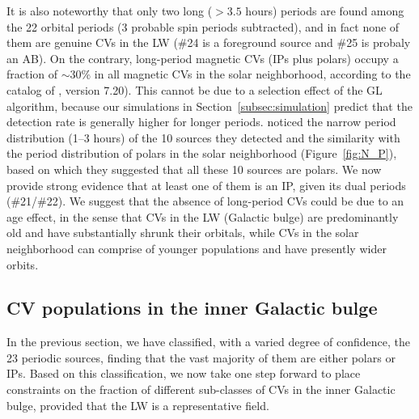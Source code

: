 \documentclass[fleqn,usenatbib]{mnras}
\begin{document}
It is also noteworthy that only two long ($>3.5$ hours) periods are found among the 22 orbital periods (3 probable spin periods subtracted), and in fact none of them are genuine CVs in the LW (\#24 is a foreground source and \#25 is probaly an AB).
On the contrary, long-period magnetic CVs (IPs plus polars) occupy a fraction of $\sim$30\% in all magnetic CVs in the solar neighborhood, according to the catalog of \citealp{2003A&A...404..301R}, version 7.20). 
This cannot be due to a selection effect of the GL algorithm, because our simulations in Section~\ref{subsec:simulation} predict that the detection rate is generally higher for longer periods.
\cite{2012ApJ...746..165H} noticed the narrow period distribution (1--3 hours) of the 10 sources they detected and the similarity with the period distribution of polars in the solar neighborhood (Figure~\ref{fig:N_P}), based on which they suggested that all these 10 sources are polars. 
We now provide strong evidence that at least one of them is an IP, given its dual periods (\#21/\#22).
We suggest that the absence of long-period CVs could be due to an age effect, in the sense that CVs in the LW (Galactic bulge) are predominantly old and have substantially shrunk their orbitals, while CVs in the solar neighborhood can comprise of younger populations and have presently wider orbits.  

\subsection{CV populations in the inner Galactic bulge}\label{subsec:population}
In the previous section, we have classified, with a varied degree of confidence, the 23 periodic sources, finding that the vast majority of them are either polars or IPs. Based on this classification, we now take one step forward to place constraints on the fraction of different sub-classes of CVs in the inner Galactic bulge, provided that the LW is a representative field. 
\end{document}
